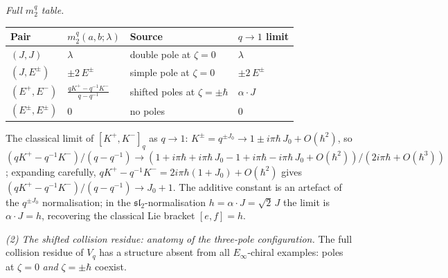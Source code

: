 \begin{conjecture}
\smallskip
\noindent
\emph{Full $m_2^q$ table.}
\begin{center}
\small
\renewcommand{\arraystretch}{1.3}
\begin{tabular}{llll}
\toprule
\textbf{Pair} & $m_2^q(a,b;\lambda)$ & \textbf{Source}
 & $q \to 1$ \textbf{limit} \\
\midrule
$(J, J)$ & $\lambda$
 & double pole at $\zeta=0$
 & $\lambda$ \\
$(J, E^\pm)$ & $\pm 2\, E^\pm$
 & simple pole at $\zeta=0$
 & $\pm 2\,E^\pm$ \\
$(E^+, E^-)$
 & $\displaystyle\frac{qK^+ - q^{-1}K^-}{q - q^{-1}}$
 & shifted poles at $\zeta=\pm\hbar$
 & $\alpha\cdot J$ \\
$(E^\pm, E^\pm)$ & $0$
 & no poles
 & $0$ \\
\bottomrule
\end{tabular}
\end{center}
The classical limit of $[K^+,K^-]_q$ as $q \to 1$:
$K^\pm = q^{\pm J_0} \to 1 \pm i\pi\hbar\, J_0 + O(\hbar^2)$, so
$(qK^+ - q^{-1}K^-)/(q-q^{-1})
\to (1 + i\pi\hbar + i\pi\hbar\,J_0 - 1 + i\pi\hbar - i\pi\hbar\,J_0
+ O(\hbar^2))/(2i\pi\hbar + O(\hbar^3))$;
expanding carefully,
$qK^+ - q^{-1}K^- = 2i\pi\hbar(1 + J_0) + O(\hbar^2)$
gives $(qK^+-q^{-1}K^-)/(q-q^{-1}) \to J_0 + 1$.
The additive constant is an artefact of the
$q^{\pm J_0}$ normalisation; in the
$\mathfrak{sl}_2$-normalisation
$h = \alpha\cdot J = \sqrt{2}\,J$ the limit is
$\alpha \cdot J = h$, recovering the classical Lie bracket
$[e, f] = h$.

\smallskip
\noindent
\emph{(2) The shifted collision residue: anatomy of the three-pole configuration.}
The full collision residue of $V_q$ has a structure absent from all
$E_\infty$-chiral examples: poles at $\zeta = 0$ \emph{and}
$\zeta = \pm\hbar$ coexist.


\end{conjecture}
